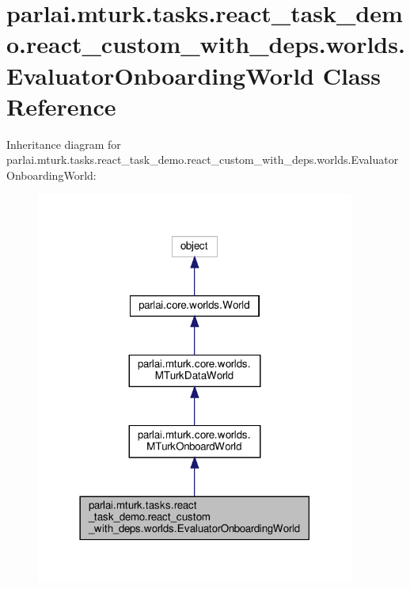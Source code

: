 \hypertarget{classparlai_1_1mturk_1_1tasks_1_1react__task__demo_1_1react__custom__with__deps_1_1worlds_1_1EvaluatorOnboardingWorld}{}\section{parlai.\+mturk.\+tasks.\+react\+\_\+task\+\_\+demo.\+react\+\_\+custom\+\_\+with\+\_\+deps.\+worlds.\+Evaluator\+Onboarding\+World Class Reference}
\label{classparlai_1_1mturk_1_1tasks_1_1react__task__demo_1_1react__custom__with__deps_1_1worlds_1_1EvaluatorOnboardingWorld}


Inheritance diagram for parlai.\+mturk.\+tasks.\+react\+\_\+task\+\_\+demo.\+react\+\_\+custom\+\_\+with\+\_\+deps.\+worlds.\+Evaluator\+Onboarding\+World\+:
\nopagebreak
\begin{figure}[H]
\begin{center}
\leavevmode
\includegraphics[width=297pt]{classparlai_1_1mturk_1_1tasks_1_1react__task__demo_1_1react__custom__with__deps_1_1worlds_1_1Evaa208471a11efc86a7c61a48a14284330}
\end{center}
\end{figure}


